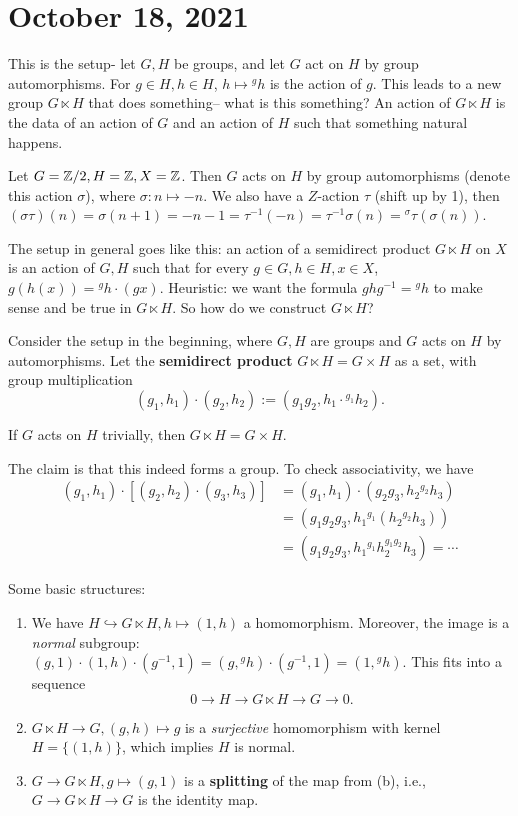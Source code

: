\section{October 18, 2021} 
This is the setup- let $G,H$ be groups, and let $G$ act on $H$ by group automorphisms. For $g \in H, h\in H$, $h \mapsto{}^gh $ is the action of $g.$ This leads to a new group $G\ltimes H$ that does something-- what is this something? An action of $G\ltimes H$ is the data of an action of $G$ and an action of $H$ such that something natural happens.
\begin{example}
    Let $G= \mathbb{Z} /2, H= \mathbb{Z}, X= \mathbb{Z}$. Then $G$ acts on $H$ by group automorphisms (denote this action $\sigma$), where $\sigma \colon n \mapsto -n $. We also have a $Z$-action $\tau$ (shift up by 1), then $(\sigma\tau )(n)=\sigma(n+1) =-n-1= \tau ^{-1} (-n)=\tau ^{-1} \sigma(n)={}^{\sigma}\tau(\sigma(n)) $.
\end{example}
The setup in general goes like this: an action of a semidirect product $G\ltimes H$ on $X$ is an action of $G,H$ such that for every $g \in G, h \in H, x\in X$, $g(h(x))={}^g h \cdot (gx) $. Heuristic: we want the formula $g h g ^{-1} = {}^gh  $ to make sense and be true in $G \ltimes H$. So how do we construct $G\ltimes H$? 
\begin{definition}
Consider the setup in the beginning, where $G,H$ are groups and $G$ acts on $H$ by automorphisms. Let the \textbf{semidirect product} $G \ltimes H = G \times H$ as a set, with group multiplication \[
    (g_1, h_1) \cdot (g_2,h_2):= (g_1g_2, h_1 \cdot {}^{g_1}h_2).
\] 
\end{definition}
\begin{example}
   If $G$ acts on $H$ trivially, then $G \ltimes H = G \times  H$.
\end{example}
The claim is that this indeed forms a group. To check associativity, we have 
\begin{align*}
    (g_1,h_1) \cdot [(g_2,h_2) \cdot (g_3,h_3)] &= (g_1,h_1) \cdot (g_2g_3, h_2 {}^{g_2}h_3)\\
                                                &=(g_1g_2g_3, h_1 {}^{g_1}(h_2 {}^{g_2}h_3))  \\
                                                &=(g_1g_2g_3, h_1 {}^{g_1}h_2 ^{g_1g_2} h_3)= \cdots 
\end{align*}
\begin{example}
    Some basic structures:
    \begin{enumerate}[label=(\alph*)]
    \setlength\itemsep{-.2em}
\item We have $H \hookrightarrow  G\ltimes H, h \mapsto (1,h)$ a homomorphism. Moreover, the image is a \emph{normal} subgroup: $(g,1) \cdot (1,h) \cdot (g ^{-1} ,1)=(g, {}^gh) \cdot (g^{-1} ,1)=(1, {}^gh) . $ This fits into a sequence \[
0 \to H \to G\ltimes H \to G \to 0.
\] 
\item $G\ltimes H \to G, (g,h)\mapsto g$ is a \emph{surjective} homomorphism with kernel $H= \{(1,h)\} $, which implies $H$ is normal.
\item $G \to G\ltimes H, g \mapsto (g,1)$ is a \textbf{splitting} of the map from (b), i.e., $G \to G\ltimes H \to G$ is the identity map.
    \end{enumerate}
\end{example}
